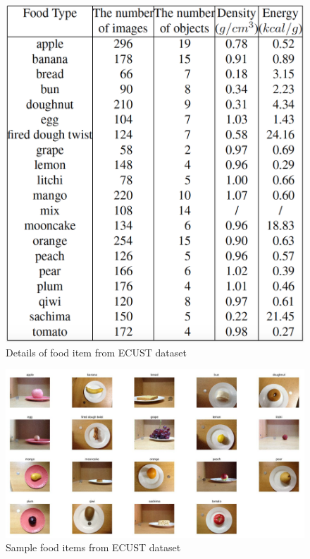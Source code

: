 \documentclass[12pt, a4paper, twoside]{article}
\begin{document}
	\begin{figure}[p]
		\centering
		\includegraphics[width=\textwidth]{table}
		\caption{Details of food item from ECUST dataset}
		\label{F:table}
	\end{figure}
	\begin{figure}[p]
		\centering
		\includegraphics[width=\textwidth]{sample}
		\caption{Sample food items from ECUST dataset}
		\label{F:sample}
	\end{figure}
\end{document}
